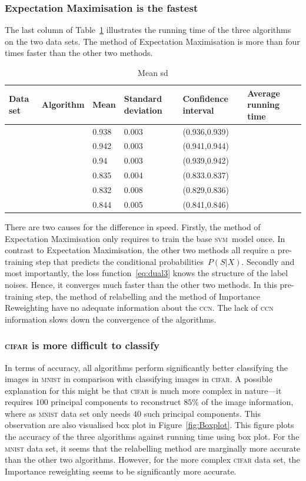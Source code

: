 \documentclass[12pt]{article} %
\newcommand{\svm}{\textsc{svm}}
\begin{document}
\subsubsection{Expectation Maximisation is the fastest}
The last column of Table~\ref{tab:Meansd} illustrates the running time of the three algorithms on the two data sets. 
The method of Expectation Maximisation is more than four times faster than the other two methods. 
\begin{table}
	\caption{Mean sd}
	\label{tab:Meansd}
\centering
\begin{tabular}{@{}llllll@{}}
\toprule
Data set& Algorithm&Mean  & Standard deviation & Confidence interval & Average running time \\ \midrule
&&0.938 & 0.003              & (0.936,0.939)     &  \\
&&0.942 & 0.003              & (0.941,0.944)     &  \\
&&0.94  & 0.003              & (0.939,0.942)     &  \\
&&0.835 & 0.004              & (0.833.0.837)     &  \\
&&0.832 & 0.008              & (0.829,0.836)     &  \\
&&0.844 & 0.005              & (0.841,0.846)     &  \\ \bottomrule
\end{tabular}
\end{table}
There are two  causes for the difference in speed. 
Firstly, the method of Expectation Maximisation only requires to train the base \svm\ model once.  
In contrast to Expectation Maximisation, the other two methods all require a pre-training step that predicts the conditional probabilities~$P(S|X)$. 
Secondly and most importantly, the loss function~\eqref{eq:dual3} knows the structure of the label noises. Hence, it converges much faster than the other two methods.  
In this pre-training step, the method of relabelling and the method of Importance Reweighting have no adequate information about the \textsc{ccn}. 
The lack of \textsc{ccn} information slows down the convergence of the algorithms.

\subsubsection{\textsc{cifar} is more difficult to classify}
In terms of accuracy, all algorithms perform significantly better classifying the images in \textsc{mnist} in comparison with classifying images in \textsc{cifar}. 
A possible explanation for this might be that \textsc{cifar} is much more complex in nature---it requires $100$ principal components to reconstruct $85\%$ of the image information, where as \textsc{mnist} data set only needs $40$ such principal components. 
This observation are also visualised box plot in Figure~\ref{fig:Boxplot}. This figure plots the accuracy of the three algorithms against running time using box plot. For the \textsc{mnist}  data set, it seems that the relabelling method are marginally more accurate than the other two algorithms. However, for the  more complex \textsc{cifar} data set, the Importance reweighting seems to be significantly more accurate. 
\end{document}
